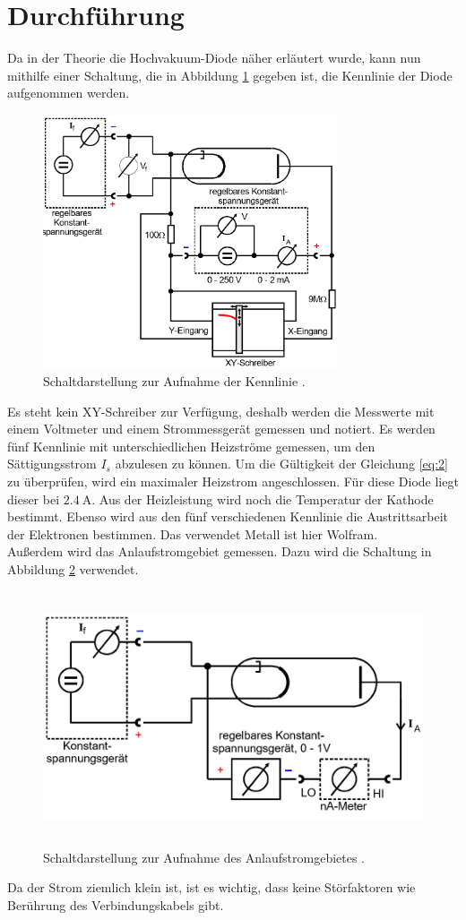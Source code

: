 \section{Durchführung}
Da in der Theorie die Hochvakuum-Diode näher erläutert wurde, kann nun mithilfe
einer Schaltung, die in Abbildung \ref{abb:4} gegeben ist, die Kennlinie
der Diode aufgenommen werden.
\begin{figure}[H]
  \centering
  \includegraphics[width=10 cm, height= 7.5cm]{content/Aufbau1.png}
  \caption{Schaltdarstellung zur Aufnahme der Kennlinie \cite{1}.}
  \label{abb:4}
\end{figure}
Es steht kein XY-Schreiber zur Verfügung, deshalb werden die Messwerte mit einem Voltmeter
und einem Strommessgerät gemessen und notiert.
Es werden fünf Kennlinie mit unterschiedlichen Heizströme gemessen, um den Sättigungsstrom
$I_s$ abzulesen zu können.
Um die Gültigkeit der Gleichung \ref{eq:2} zu überprüfen, wird ein maximaler Heizstrom
angeschlossen. Für diese Diode liegt dieser bei $\SI{2.4}{\ampere}$.
Aus der Heizleistung wird noch die Temperatur der Kathode bestimmt.
Ebenso wird aus den fünf verschiedenen Kennlinie die Austrittsarbeit der Elektronen bestimmen.
Das verwendet Metall ist hier Wolfram.\\
Außerdem wird das Anlaufstromgebiet gemessen. Dazu wird die Schaltung in Abbildung \ref{abb:5}
verwendet.
\begin{figure}[H]
  \centering
  \includegraphics[width=10 cm, height= 7.5cm]{content/Aufbau2.png}
  \caption{Schaltdarstellung zur Aufnahme des Anlaufstromgebietes \cite{1}.}
  \label{abb:5}
\end{figure}
Da der Strom ziemlich klein ist, ist es wichtig, dass keine Störfaktoren wie Berührung des
Verbindungskabels gibt.

